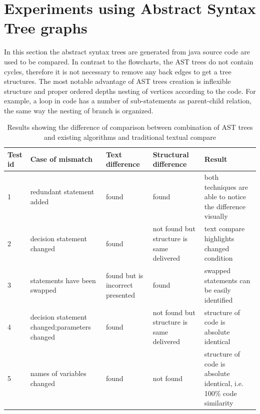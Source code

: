 \documentclass{report}
\begin{document}
\section{Experiments using Abstract Syntax Tree graphs}

In this section the abstract syntax trees are generated from java source code are used to be compared. In contrast to the flowcharts, the AST trees do not contain cycles, therefore it is not necessary to remove any back edges to get a tree structures. The most notable advantage of AST trees creation is inflexible structure and proper ordered depths nesting of vertices according to the code. For example, a loop in code has a number of sub-statements as parent-child relation, the same way the nesting of branch is organized.

\begin{table}[h]

\begin{tabular}{|p{0.5cm}|p{3cm}|p{2cm}|p{3cm}|p{5cm}|}
\hline
\rowcolor[HTML]{C0C0C0} 
Test id & Case of mismatch                                           & Text difference                  & Structural difference                           & Result \\ \hline
1       & redundant statement added                      & found                            & found                                    & both techniques are able to notice the difference visually \\ \hline
2       & decision statement changed                     & found                            & not found but structure is same delivered & text compare highlights changed condition   \\ \hline
3       & statements have been swapped                   & found but is incorrect presented & found                                    & swapped statements can be easily identified \\ \hline
4       & decision statement changed;\newline parameters changed & found                            & not found but structure is same delivered                                & structure of code is absolute identical\\ \hline
5       & names of variables changed                     & found                            & not found                                &                                             structure of code is absolute identical, i.e. 100\% code similarity \\ \hline
\end{tabular}
\caption[Summary of comparison between textual and structural compare with AST]{Results showing the difference of comparison between combination of AST trees and existing algorithms and traditional textual compare }
\label{table:ast_res}
\end{table}
\end{document}
